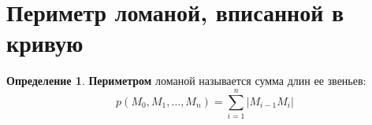 \documentclass{report}
\theoremstyle{definition}
\newtheorem*{definition}{Определение}
\begin{document}
\section{Периметр ломаной, вписанной в кривую}

\begin{definition}
    \textbf{Периметром} ломаной называется сумма длин ее звеньев:
    \begin{equation*}
        p(M_0,M_1,\ldots,M_n) = \sum_{i=1}^{n}| M_{i-1}M_i |
    \end{equation*}
    \begin{figure}[h]
        \begin{minipage}[h]{0.49\linewidth}
        \end{minipage}
        \hfill
        \begin{minipage}[h]{0.49\linewidth}
        \end{minipage}
    \end{figure}
\end{definition}
\end{document}
